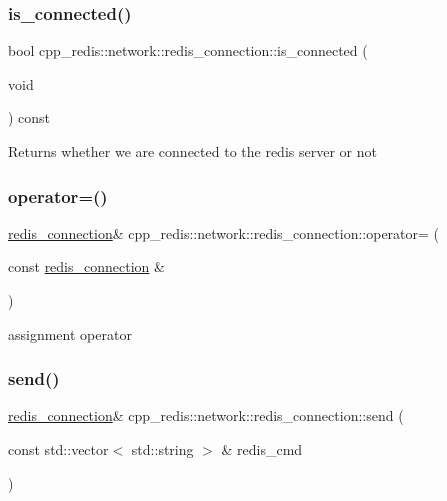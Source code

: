 \subsubsection{\texorpdfstring{is\+\_\+connected()}{is\_connected()}}
{\footnotesize\ttfamily bool cpp\+\_\+redis\+::network\+::redis\+\_\+connection\+::is\+\_\+connected (\begin{DoxyParamCaption}\item[{void}]{ }\end{DoxyParamCaption}) const}

\begin{DoxyReturn}{Returns}
whether we are connected to the redis server or not 
\end{DoxyReturn}
\mbox{\label{classcpp__redis_1_1network_1_1redis__connection_a54a4c28ad1b9e9f3bac2854fddf4e30d}} 
\subsubsection{\texorpdfstring{operator=()}{operator=()}}
{\footnotesize\ttfamily \hyperlink{classcpp__redis_1_1network_1_1redis__connection}{redis\+\_\+connection}\& cpp\+\_\+redis\+::network\+::redis\+\_\+connection\+::operator= (\begin{DoxyParamCaption}\item[{const \hyperlink{classcpp__redis_1_1network_1_1redis__connection}{redis\+\_\+connection} \&}]{ }\end{DoxyParamCaption})\hspace{0.3cm}{\ttfamily [delete]}}



assignment operator 

\mbox{\label{classcpp__redis_1_1network_1_1redis__connection_a98c163ce431e85e46e139211564b7b3f}} 
\subsubsection{\texorpdfstring{send()}{send()}}
{\footnotesize\ttfamily \hyperlink{classcpp__redis_1_1network_1_1redis__connection}{redis\+\_\+connection}\& cpp\+\_\+redis\+::network\+::redis\+\_\+connection\+::send (\begin{DoxyParamCaption}\item[{const std\+::vector$<$ std\+::string $>$ \&}]{redis\+\_\+cmd }\end{DoxyParamCaption})}

